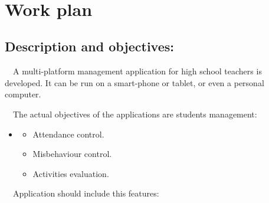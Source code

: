 \documentclass[a4paper]{article}
\begin{document}
\ \ \ \ \ \ \ \ %



\bigskip

\section{}
\clearpage\section[Work plan]{Work plan}
\hypertarget{RefHeading114161570052158}{}\subsection[Description and
objectives:]{Description and objectives:}
\hypertarget{RefHeading115461570052158}{}\ \ A multi-platform management
application for high school teachers is developed. It can be run on a
smart-phone or tablet, or even a personal computer. 

\ \ The actual objectives of the applications are
student{\textquotesingle}s management:

\begin{itemize}
\item \begin{itemize}
\item Attendance control.
\item Misbehaviour control.
\item Activities evaluation.
\end{itemize}
\end{itemize}
\ \ Application should include this features:
\end{document}
